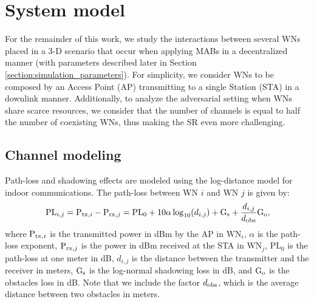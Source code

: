 \documentclass[preprint,12pt]{elsarticle}
\begin{document}
\section{System model}
\label{section:system_model}	

For the remainder of this work, we study the interactions between several WNs placed in a 3-D scenario that occur when applying MABs in a decentralized manner (with parameters described later in Section \ref{section:simulation_parameters}). For simplicity, we consider WNs to be composed by an Access Point (AP) transmitting to a single Station (STA) in a downlink manner. Additionally, to analyze the adversarial setting when WNs share scarce resources, we consider that the number of channels is equal to half the number of coexisting WNs, thus making the SR even more challenging. 

\subsection{Channel modeling}
\label{section:channel_modelling}		
Path-loss and shadowing effects are modeled using the log-distance model for indoor communications. The path-loss between WN $i$ and WN $j$ is given by:	
\begin{equation}
\text{PL}_{i,j} = \text{P}_{{\rm tx},i} - \text{P}_{{\rm rx},j} = \text{PL}_0 + 10  \alpha  \log_{10}(d_{i,j}) + \text{G}_{{\rm s}} + \frac{d_{i,j}}{d_{{\rm obs}}} \text{G}_{{\rm o}}, \nonumber
\nonumber
\end{equation}
where $\text{P}_{{\rm tx},i}$ is the transmitted power in dBm by the AP in $\text{WN}_i$, $\alpha$ is the path-loss exponent, $\text{P}_{{\rm rx},j}$ is the power in dBm received at the STA in $\text{WN}_j$, $\text{PL}_0$ is the path-loss at one meter in dB, $d_{i,j}$ is the distance between the transmitter and the receiver in meters, $\text{G}_{{\rm s}}$ is the log-normal shadowing loss in dB, and $\text{G}_{{\rm o}}$ is the obstacles loss in dB. Note that we include the factor $d_{{\rm obs}}$, which is the average distance between two obstacles in meters. 

\end{document}
